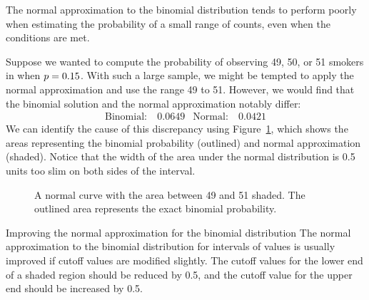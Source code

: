 The normal approximation to the binomial distribution tends to perform poorly when estimating the probability of a small range of counts, even when the conditions are met.

\newcommand{\smokeA}{49}
\newcommand{\smokeB}{50}
\newcommand{\smokeC}{51}
\newcommand{\smokeABCBinom}{0.0649}
\newcommand{\smokeABCNormal}{0.0421}
\newcommand{\smokeABCNormalFixed}{0.0633}

Suppose we wanted to compute the probability of observing
\smokeA{}, \smokeB{}, or \smokeC{} smokers in \smoken{}
when $p = 0.15{}$.
With such a large sample, we might be tempted to apply
the normal approximation and use the range \smokeA{} to \smokeC{}.
However, we would find that the binomial solution and the normal
approximation notably differ:
\begin{align*}
\text{Binomial:}&\ \smokeABCBinom{}
&\text{Normal:}&\ \smokeABCNormal{}
\end{align*}
We can identify the cause of this discrepancy using
Figure~\ref{normApproxToBinomFail}, which shows the areas
representing the binomial probability (outlined) and normal
approximation (shaded).
Notice that the width of the area under the normal
distribution is 0.5 units too slim on both sides of
the interval.

\begin{figure}[h]
  \centering
  \caption{A normal curve with the area between
      \smokeA{} and \smokeC{} shaded.
      The outlined area represents the exact binomial
      probability.}
  \label{normApproxToBinomFail}
\end{figure}

\begin{onebox}{Improving the normal approximation
    for the binomial distribution}
  The normal approximation to the binomial distribution
  for intervals of values is usually improved if cutoff
  values are modified slightly.
  The cutoff values for the lower end of a shaded region
  should be reduced by 0.5, and the cutoff value for the
  upper end should be increased by 0.5.
\end{onebox}

